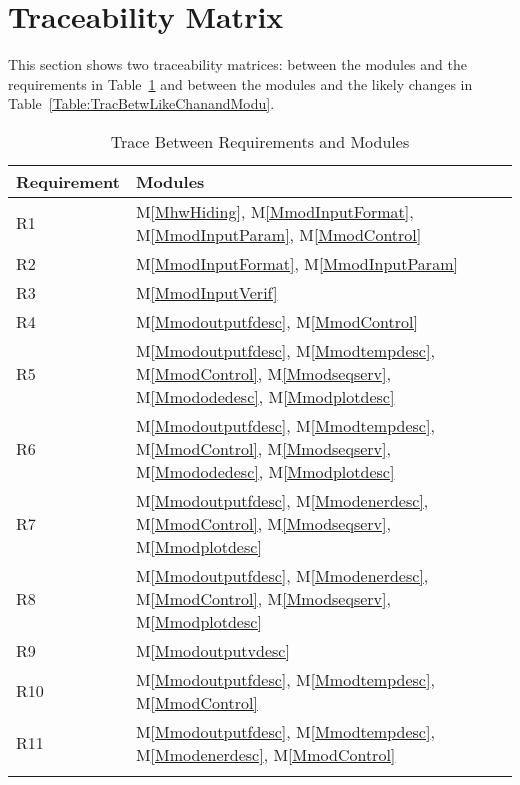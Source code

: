 \documentclass[12pt]{article}
\begin{document}
\section{Traceability Matrix}
\label{Sec:TracMatr}
This section shows two traceability matrices: between the modules and the requirements in Table~\ref{Table:TracBetwRequandModu} and between the modules and the likely changes in Table~\ref{Table:TracBetwLikeChanandModu}.
\begin{longtable}{l l}
\toprule
Requirement & Modules
\\
\midrule
R1 & M\ref{MhwHiding}, M\ref{MmodInputFormat}, M\ref{MmodInputParam}, M\ref{MmodControl}
\\
R2 & M\ref{MmodInputFormat}, M\ref{MmodInputParam}
\\
R3 & M\ref{MmodInputVerif}
\\
R4 & M\ref{Mmodoutputfdesc}, M\ref{MmodControl}
\\
R5 & M\ref{Mmodoutputfdesc}, M\ref{Mmodtempdesc}, M\ref{MmodControl}, M\ref{Mmodseqserv}, M\ref{Mmododedesc}, M\ref{Mmodplotdesc}
\\
R6 & M\ref{Mmodoutputfdesc}, M\ref{Mmodtempdesc}, M\ref{MmodControl}, M\ref{Mmodseqserv}, M\ref{Mmododedesc}, M\ref{Mmodplotdesc}
\\
R7 & M\ref{Mmodoutputfdesc}, M\ref{Mmodenerdesc}, M\ref{MmodControl}, M\ref{Mmodseqserv}, M\ref{Mmodplotdesc}
\\
R8 & M\ref{Mmodoutputfdesc}, M\ref{Mmodenerdesc}, M\ref{MmodControl}, M\ref{Mmodseqserv}, M\ref{Mmodplotdesc}
\\
R9 & M\ref{Mmodoutputvdesc}
\\
R10 & M\ref{Mmodoutputfdesc}, M\ref{Mmodtempdesc}, M\ref{MmodControl}
\\
R11 & M\ref{Mmodoutputfdesc}, M\ref{Mmodtempdesc}, M\ref{Mmodenerdesc}, M\ref{MmodControl}
\\
\bottomrule
\caption{Trace Between Requirements and Modules}
\label{Table:TracBetwRequandModu}
\end{longtable}
\end{document}
